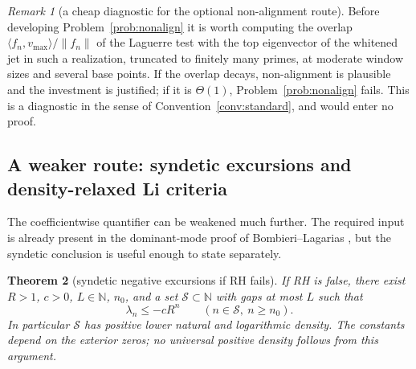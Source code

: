 \documentclass[11pt]{amsart}
\newtheorem{theorem}{Theorem}[section]
\theoremstyle{definition}
\theoremstyle{remark}
\newtheorem{remark}[theorem]{Remark}
\theoremstyle{definition}
\begin{document}
\begin{remark}[a cheap diagnostic for the optional non-alignment route]\label{rmk:diag-overlap}
Before developing Problem~\ref{prob:nonalign} it is worth computing the overlap
$\langle f_n,v_{\max}\rangle/\|f_n\|$ of the Laguerre test with the top eigenvector of the whitened
jet in such a realization, truncated to finitely many primes, at moderate window sizes and several base points. If the overlap decays, non-alignment is
plausible and the investment is justified; if it is $\Theta(1)$, Problem~\ref{prob:nonalign} fails. This is a diagnostic in the sense of
Convention~\ref{conv:standard}, and would enter no proof.
\end{remark}

\subsection{A weaker route: syndetic excursions and density-relaxed Li criteria}
\label{sec:density-criterion}

The coefficientwise quantifier can be weakened much further.  The required input is already
present in the dominant-mode proof of Bombieri--Lagarias
\cite[Theorem~1(c)]{BombieriLagarias1999}, but the syndetic conclusion is useful enough to state
separately.

\begin{theorem}[syndetic negative excursions if RH fails]\label{thm:syndetic-li}
If RH is false, there exist $R>1$, $c>0$, $L\in\mathbb N$, $n_0$, and a set
$\mathcal S\subset\mathbb N$ with gaps at most $L$ such that
\begin{equation}\label{eq:syndetic-excursion}
   \lambda_n\le-cR^n\qquad(n\in\mathcal S,\ n\ge n_0).
\end{equation}
In particular $\mathcal S$ has positive lower natural and logarithmic density.  The constants
depend on the exterior zeros; no universal positive density follows from this argument.
\end{theorem}
\end{document}
